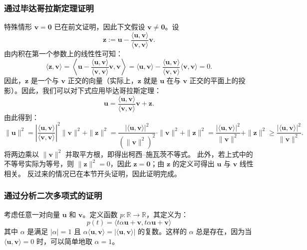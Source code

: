 \subsubsection{通过毕达哥拉斯定理证明}
特殊情形 $\mathbf{v} = \mathbf{0}$ 已在前文证明，因此下文假设 $\mathbf{v} \neq \mathbf{0}$。设
$$
\mathbf{z} := \mathbf{u} - \frac{\langle \mathbf{u}, \mathbf{v} \rangle}{\langle \mathbf{v}, \mathbf{v} \rangle} \mathbf{v}.~
$$
由内积在第一个参数上的线性性可知：
$$
\langle \mathbf{z}, \mathbf{v} \rangle = \left\langle \mathbf{u} - \frac{\langle \mathbf{u}, \mathbf{v} \rangle}{\langle \mathbf{v}, \mathbf{v} \rangle} \mathbf{v}, \mathbf{v} \right\rangle = \langle \mathbf{u}, \mathbf{v} \rangle - \frac{\langle \mathbf{u}, \mathbf{v} \rangle}{\langle \mathbf{v}, \mathbf{v} \rangle} \langle \mathbf{v}, \mathbf{v} \rangle = 0.~
$$
因此，$\mathbf{z}$ 是一个与 $\mathbf{v}$ 正交的向量（实际上，$\mathbf{z}$ 就是 $\mathbf{u}$ 在与 $\mathbf{v}$ 正交的平面上的投影）。因此，我们可以对下式应用毕达哥拉斯定理：
$$
\mathbf{u} = \frac{\langle \mathbf{u}, \mathbf{v} \rangle}{\langle \mathbf{v}, \mathbf{v} \rangle} \mathbf{v} + \mathbf{z}.~
$$
由此得到：
$$
\|\mathbf{u}\|^{2} = \left| \frac{\langle \mathbf{u}, \mathbf{v} \rangle}{\langle \mathbf{v}, \mathbf{v} \rangle} \right|^{2} \|\mathbf{v}\|^{2} + \|\mathbf{z}\|^{2} = \frac{|\langle \mathbf{u}, \mathbf{v} \rangle|^{2}}{(\|\mathbf{v}\|^{2})^{2}} \cdot \|\mathbf{v}\|^{2} + \|\mathbf{z}\|^{2} = \frac{|\langle \mathbf{u}, \mathbf{v} \rangle|^{2}}{\|\mathbf{v}\|^{2}} + \|\mathbf{z}\|^{2} \geq \frac{|\langle \mathbf{u}, \mathbf{v} \rangle|^{2}}{\|\mathbf{v}\|^{2}}.~
$$
将两边乘以 $\|\mathbf{v}\|^{2}$ 并取平方根，即得出柯西–施瓦茨不等式。
此外，若上式中的不等号实际为等号，则 $\|\mathbf{z}\|^{2} = 0$，因此 $\mathbf{z} = \mathbf{0}$；由 $\mathbf{z}$ 的定义可得出 $\mathbf{u}$ 与 $\mathbf{v}$ 线性相关。
反过来的情况已在本节开头证明，因此证明完成。
\subsubsection{通过分析二次多项式的证明}
考虑任意一对向量 $\mathbf{u}$ 和 $\mathbf{v}$。定义函数 $p : \mathbb{R} \to \mathbb{R}$，其定义为：
$$
p(t) = \langle t \alpha \mathbf{u} + \mathbf{v}, t \alpha \mathbf{u} + \mathbf{v} \rangle~
$$
其中 $\alpha$ 是满足 $|\alpha| = 1$ 且 $\alpha \langle \mathbf{u}, \mathbf{v} \rangle = |\langle \mathbf{u}, \mathbf{v} \rangle|$ 的复数。这样的 $\alpha$ 总是存在，因为当 $\langle \mathbf{u}, \mathbf{v} \rangle = 0$ 时，可以简单地取 $\alpha = 1$。

